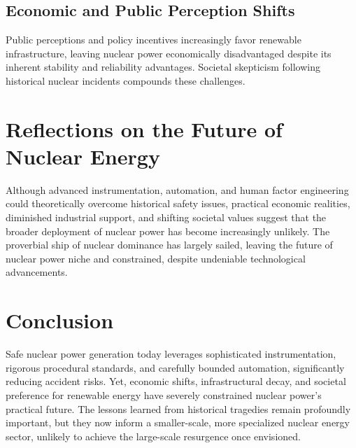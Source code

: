 \documentclass[12pt]{article}
\begin{document}
\subsection{Economic and Public Perception Shifts}
Public perceptions and policy incentives increasingly favor renewable infrastructure, leaving nuclear power economically disadvantaged despite its inherent stability and reliability advantages. Societal skepticism following historical nuclear incidents compounds these challenges.

\section{Reflections on the Future of Nuclear Energy}
Although advanced instrumentation, automation, and human factor engineering could theoretically overcome historical safety issues, practical economic realities, diminished industrial support, and shifting societal values suggest that the broader deployment of nuclear power has become increasingly unlikely. The proverbial ship of nuclear dominance has largely sailed, leaving the future of nuclear power niche and constrained, despite undeniable technological advancements.

\section{Conclusion}
Safe nuclear power generation today leverages sophisticated instrumentation, rigorous procedural standards, and carefully bounded automation, significantly reducing accident risks. Yet, economic shifts, infrastructural decay, and societal preference for renewable energy have severely constrained nuclear power's practical future. The lessons learned from historical tragedies remain profoundly important, but they now inform a smaller-scale, more specialized nuclear energy sector, unlikely to achieve the large-scale resurgence once envisioned.

\newpage
\printbibliography
\end{document}
